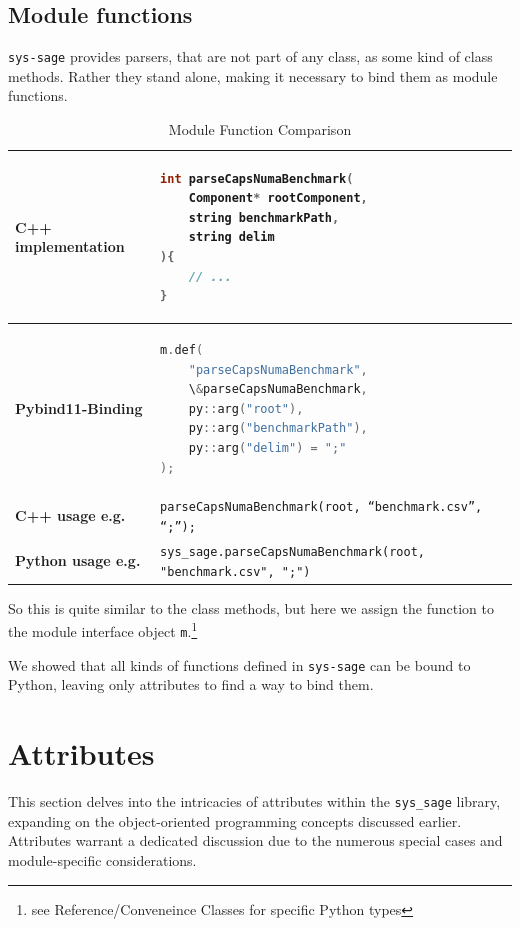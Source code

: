 \subsection{Module functions}

\texttt{sys-sage} provides parsers, that are not part of any class, as some kind of class methods. Rather they stand alone, making it necessary to bind them as module functions.

\begin{table}[htbp]
\centering
\begin{tabular}{|l|l|}
\hline
\textbf{C++ implementation} &
\begin{lstlisting}[language=C++]
int parseCapsNumaBenchmark(
    Component* rootComponent,
    string benchmarkPath,
    string delim
){
    // ...
}
\end{lstlisting}
\\ \hline
\textbf{Pybind11-Binding} &
\begin{lstlisting}[language=C++]
m.def(
    "parseCapsNumaBenchmark",
    \&parseCapsNumaBenchmark,
    py::arg("root"),
    py::arg("benchmarkPath"),
    py::arg("delim") = ";"
);
\end{lstlisting}
\\ \hline
\textbf{C++ usage e.g.} &
\verb|parseCapsNumaBenchmark(root, “benchmark.csv”, “;”);| \\ \hline
\textbf{Python usage e.g.} &
\verb|sys_sage.parseCapsNumaBenchmark(root, "benchmark.csv", ";")| \\ \hline
\end{tabular}
\caption{Module Function Comparison}
\label{tab:module_functions}
\end{table}

So this is quite similar to the class methods, but here we assign the function to the module interface object \verb|m|.\cite{pybind11-docu}\footnote{see Reference/Conveneince Classes for specific Python types\label{fn:specific_python_types}}

\smallskip
We showed that all kinds of functions defined in \texttt{sys-sage} can be bound to Python, leaving only attributes to find a way to bind them.

\section{Attributes}

This section delves into the intricacies of attributes within the \verb|sys_sage| library, expanding on the object-oriented programming concepts discussed earlier. Attributes warrant a dedicated discussion due to the numerous special cases and module-specific considerations.

